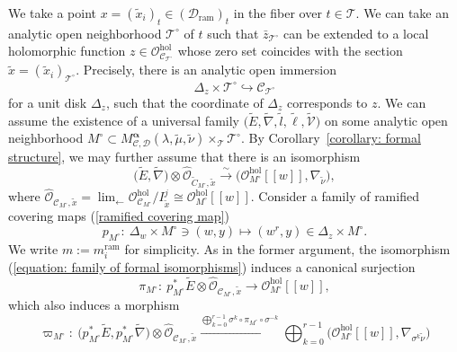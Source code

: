 \documentclass[pdftex]{sigma}
\numberwithin{equation}{section}
\newcommand{\balpha}{\boldsymbol \alpha}
\begin{document}
We take a point $x=(\tilde{x}_i)_t\in ({\mathcal D}_{\mathrm{ram}})_t$
in the fiber over $t\in {\mathcal T}$.
We can take an analytic open neighborhood
${\mathcal T}^{\circ}$ of $t$ such that
$\bar{z}_{\mathcal T^{\circ}}$ can be extended to a local holomorphic function
$z\in{\mathcal O}_{{\mathcal C}_{\mathcal T^{\circ}}}^{\mathrm{hol}}$
whose zero set coincides with the section $\tilde{x}=(\tilde{x}_i)_{\mathcal T^{\circ}}$.
Precisely, there is an analytic open immersion
\[
 \Delta_z\times{\mathcal T^{\circ}}\hookrightarrow{\mathcal C}_{\mathcal T^{\circ}}
\]
for a unit disk $\Delta_z$, such that the coordinate of $\Delta_z$ corresponds to $z$.
We can assume the existence of a universal family
$\big(\!\tilde{E},\tilde{\nabla},\tilde{l},\tilde{\ell},\tilde{\mathcal V}\big)$
on some analytic open neighborhood
${M^{\circ}\!\subset\! M^{\balpha}_{{\mathcal C},{\mathcal D}}(\lambda,\tilde{\mu},\tilde{\nu})
\!\times_{\mathcal T} \!{\mathcal T^{\circ}}}\!.\!$
By Corollary~\ref{corollary: formal structure},
we may further assume that
there is an isomorphism
\begin{equation} \label{equation: family of formal isomorphisms}
 \big(\tilde{E},\tilde{\nabla}\big)\otimes\widehat{\mathcal O}_{\tilde{C}_{M^{\circ}},\tilde{x}}
 \stackrel{\sim}\longrightarrow
 \big({\mathcal O}_{M^{\circ}}^{\mathrm{hol}}[[w]],\nabla_{\tilde{\nu}}\big),
\end{equation}
where
$\displaystyle\widehat{\mathcal O}_{{\mathcal C}_{M^{\circ}},\tilde{x}}=
\lim_{\longleftarrow}{\mathcal O}^{\mathrm{hol}}_{{\mathcal C}_{M^{\circ}}}/I_{\tilde{x}}^j
\cong{\mathcal O}_{M^{\circ}}^{\mathrm{hol}}[[w]]$.
Consider a family of ramified covering maps (\ref{ramified covering map})
\[
 p_{M^{\circ}} \colon \ \Delta_w\times M^{\circ} \ni (w,y) \mapsto (w^r,y)
 \in \Delta_z\times M^{\circ}.
\]
We write $m:=m^{\mathrm{ram}}_i$ for simplicity.
As in the former argument,
the isomorphism (\ref{equation: family of formal isomorphisms})
induces a canonical surjection
\begin{equation*}
 \pi_{M^{\circ}} \colon \
 p_{M^{\circ}}^*\tilde{E}\otimes
 \widehat{\mathcal O}_{{\mathcal C}_{M^{\circ}},\tilde{x}}
 \longrightarrow
 {\mathcal O}_{M^{\circ}}^{\mathrm{hol}}[[w]],
\end{equation*}
which also induces a morphism
\begin{equation} \label{equation:comparison with diagonal on the ramified cover}
 \varpi_{M^{\circ}} \colon \
 \big(p_{M^{\circ}}^*\tilde{E},p_{M^{\circ}}^*\tilde{\nabla}\big)\otimes
 \widehat{\mathcal O}_{{\mathcal C}_{M^{\circ}},\tilde{x}}
 \xrightarrow{\bigoplus_{k=0}^{r-1}\sigma^k\circ\pi_{M^{\circ}}\circ\sigma^{-k}}
 \bigoplus_{k=0}^{r-1}
 \big({\mathcal O}_{M^{\circ}}^{\mathrm{hol}}[[w]],\nabla_{\sigma^k\tilde{\nu}}\big)
\end{equation}
\end{document}
